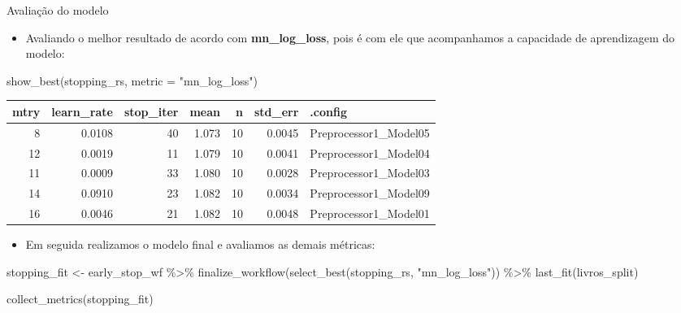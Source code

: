 \documentclass[
  9 pt,
  ignorenonframetext,
]{beamer}
\newenvironment{Shaded}{\begin{snugshade}}{\end{snugshade}}
\newcommand{\AttributeTok}[1]{\textcolor[rgb]{0.77,0.63,0.00}{#1}}
\newcommand{\FunctionTok}[1]{\textcolor[rgb]{0.00,0.00,0.00}{#1}}
\newcommand{\NormalTok}[1]{#1}
\newcommand{\OtherTok}[1]{\textcolor[rgb]{0.56,0.35,0.01}{#1}}
\newcommand{\SpecialCharTok}[1]{\textcolor[rgb]{0.00,0.00,0.00}{#1}}
\newcommand{\StringTok}[1]{\textcolor[rgb]{0.31,0.60,0.02}{#1}}
\providecommand{\tightlist}{%
  \setlength{\itemsep}{0pt}\setlength{\parskip}{0pt}}
\begin{document}
\begin{frame}[fragile]{Avaliação do modelo}
\begin{itemize}
\tightlist
\item
  Avaliando o melhor resultado de acordo com \textbf{mn\_log\_loss},
  pois é com ele que acompanhamos a capacidade de aprendizagem do
  modelo:
\end{itemize}

\begin{Shaded}
\begin{Highlighting}[]
\FunctionTok{show\_best}\NormalTok{(stopping\_rs, }\AttributeTok{metric =} \StringTok{"mn\_log\_loss"}\NormalTok{)}
\end{Highlighting}
\end{Shaded}

\begin{table}[H]
\centering
\begin{tabular}{rrrrrrl}
\toprule
mtry & learn\_rate & stop\_iter & mean & n & std\_err & .config\\
\midrule
8 & 0.0108 & 40 & 1.073 & 10 & 0.0045 & Preprocessor1\_Model05\\
12 & 0.0019 & 11 & 1.079 & 10 & 0.0041 & Preprocessor1\_Model04\\
11 & 0.0009 & 33 & 1.080 & 10 & 0.0028 & Preprocessor1\_Model03\\
14 & 0.0910 & 23 & 1.082 & 10 & 0.0034 & Preprocessor1\_Model09\\
16 & 0.0046 & 21 & 1.082 & 10 & 0.0048 & Preprocessor1\_Model01\\
\bottomrule
\end{tabular}
\end{table}

\begin{itemize}
\tightlist
\item
  Em seguida realizamos o modelo final e avaliamos as demais métricas:
\end{itemize}

\begin{Shaded}
\begin{Highlighting}[]
\NormalTok{stopping\_fit }\OtherTok{\textless{}{-}}\NormalTok{ early\_stop\_wf }\SpecialCharTok{\%\textgreater{}\%}
  \FunctionTok{finalize\_workflow}\NormalTok{(}\FunctionTok{select\_best}\NormalTok{(stopping\_rs, }\StringTok{"mn\_log\_loss"}\NormalTok{)) }\SpecialCharTok{\%\textgreater{}\%}
  \FunctionTok{last\_fit}\NormalTok{(livros\_split)}

\FunctionTok{collect\_metrics}\NormalTok{(stopping\_fit)}
\end{Highlighting}
\end{Shaded}


\end{frame}
\end{document}
